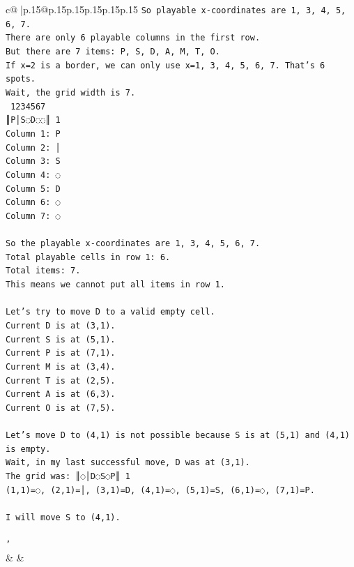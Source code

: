 \documentclass{article}
\begin{document}
{\begin{supertabular}{c@{$\;$}|p{.15\linewidth}@{}p{.15\linewidth}p{.15\linewidth}p{.15\linewidth}p{.15\linewidth}p{.15\linewidth}}
{{{\texttt{So playable x{-}coordinates are 1, 3, 4, 5, 6, 7.} \\
\texttt{There are only 6 playable columns in the first row.} \\
\texttt{But there are 7 items: P, S, D, A, M, T, O.} \\
\texttt{If x=2 is a border, we can only use x=1, 3, 4, 5, 6, 7. That's 6 spots.} \\
\texttt{Wait, the grid width is 7.} \\
\texttt{ 1234567} \\
\texttt{║P│S◌D◌◌║ 1} \\
\texttt{Column 1: P} \\
\texttt{Column 2: │} \\
\texttt{Column 3: S} \\
\texttt{Column 4: ◌} \\
\texttt{Column 5: D} \\
\texttt{Column 6: ◌} \\
\texttt{Column 7: ◌} \\
\\ 
\texttt{So the playable x{-}coordinates are 1, 3, 4, 5, 6, 7.} \\
\texttt{Total playable cells in row 1: 6.} \\
\texttt{Total items: 7.} \\
\texttt{This means we cannot put all items in row 1.} \\
\\ 
\texttt{Let's try to move D to a valid empty cell.} \\
\texttt{Current D is at (3,1).} \\
\texttt{Current S is at (5,1).} \\
\texttt{Current P is at (7,1).} \\
\texttt{Current M is at (3,4).} \\
\texttt{Current T is at (2,5).} \\
\texttt{Current A is at (6,3).} \\
\texttt{Current O is at (7,5).} \\
\\ 
\texttt{Let's move D to (4,1) is not possible because S is at (5,1) and (4,1) is empty.} \\
\texttt{Wait, in my last successful move, D was at (3,1).} \\
\texttt{The grid was: ║◌│D◌S◌P║ 1} \\
\texttt{(1,1)=◌, (2,1)=│, (3,1)=D, (4,1)=◌, (5,1)=S, (6,1)=◌, (7,1)=P.} \\
\\ 
\texttt{I will move S to (4,1).} \\
\\ 
\texttt{'} \\
            }
        }
    }
    & & \\ \\


\end{supertabular}}
\end{document}

